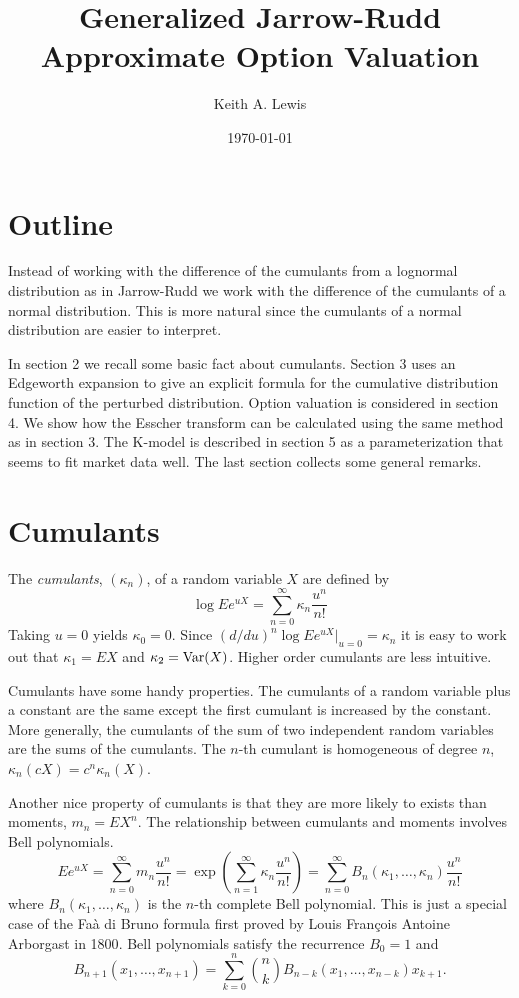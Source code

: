 \documentclass[11pt]{article}
\title{Generalized Jarrow-Rudd Approximate Option Valuation}
\author{Keith A. Lewis}
\date{\today}
\newcommand{\Var}{\mathop{\rm{Var}}}
\begin{document}
\maketitle

\section{Outline}

Instead of working with the difference of the cumulants from a lognormal
distribution as in Jarrow-Rudd \cite{?} we work with the difference of
the cumulants of a normal distribution. 
This is more natural since the cumulants of a normal distribution are
easier to interpret.

In section 2 we recall some basic fact about cumulants.
Section 3 uses an Edgeworth expansion to give an explicit formula for
the cumulative distribution function of the perturbed distribution.
Option valuation is considered in section 4. We show how the
Esscher transform can be calculated using the same method as in
section 3. The K-model is described in section 5 as a parameterization
that seems to fit market data well. The last section collects some
general remarks.

\section{Cumulants}

The {\em cumulants}, \((\kappa_n)\), of a random variable \(X\)
are defined by
\[
\log Ee^{uX} = \sum_{n=0}^\infty \kappa_n \frac{u^n}{n!}
\]
Taking \(u = 0\) yields \(\kappa_0 = 0\). Since
\((d/du)^n\log Ee^{uX}|_{u = 0} = \kappa_n\) it is easy to
work out that
\(\kappa_1 = EX\) and \(\kappa_2 = \Var(X)\). Higher order
cumulants are less intuitive.

Cumulants have some handy properties. 
The cumulants of a random variable plus a constant are the 
same except the first cumulant is increased by the constant.
More generally, the cumulants of the sum of two independent 
random variables are the sums of the cumulants.
The \(n\)-th cumulant is homogeneous of degree \(n\), 
\(\kappa_n(cX) = c^n\kappa_n(X)\).

Another nice property of cumulants is that they are more likely
to exists than moments, \(m_n = EX^n\).
The relationship between cumulants and moments involves Bell polynomials\cite{?}.
\[
Ee^{uX} = \sum_{n=0}^\infty m_n \frac{u^n}{n!}
 = \exp(\sum_{n=1}^\infty \kappa_n \frac{u^n}{n!})
= \sum_{n=0}^\infty B_n(\kappa_1,\dots,\kappa_n) \frac{u^n}{n!}
\]
where \(B_n(\kappa_1,\dots,\kappa_n)\) is the \(n\)-th complete
Bell polynomial.
This is just a special case of the
Fa\`a di Bruno formula first proved by Louis Fran\c{c}ois Antoine
Arborgast in 1800\cite{Arborgast}.
Bell polynomials satisfy the recurrence \cite{Comtet} \(B_0 = 1\) and
\[
B_{n+1}(x_1,\dots,x_{n+1}) = \sum_{k=0}^n \binom{n}{k}
B_{n - k}(x_1,\dots, x_{n - k}) x_{k+1}.
\]
\end{document}
